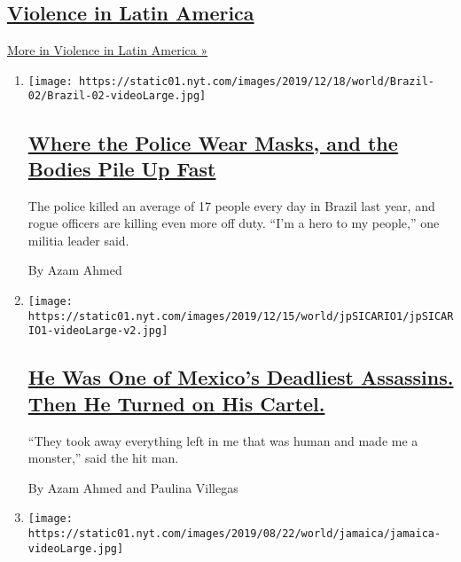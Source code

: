 \hypertarget{violence-in-latin-america}{%
\subsection{\texorpdfstring{\href{/spotlight/violence-in-latin-america}{Violence
in Latin
America}}{Violence in Latin America}}\label{violence-in-latin-america}}

\href{/spotlight/violence-in-latin-america}{More in Violence in Latin
America »}

\begin{enumerate}
\def\labelenumi{\arabic{enumi}.}
\item
  \texttt{[image: https://static01.nyt.com/images/2019/12/18/world/Brazil-02/Brazil-02-videoLarge.jpg]}

  \hypertarget{where-the-police-wear-masks-and-the-bodies-pile-up-fast}{%
  \subsection{\texorpdfstring{\href{/2019/12/20/world/americas/brazil-police-shootings-murder.html}{Where
  the Police Wear Masks, and the Bodies Pile Up
  Fast}}{Where the Police Wear Masks, and the Bodies Pile Up Fast}}\label{where-the-police-wear-masks-and-the-bodies-pile-up-fast}}

  The police killed an average of 17 people every day in Brazil last
  year, and rogue officers are killing even more off duty. ``I'm a hero
  to my people,'' one militia leader said.

  By Azam Ahmed
\item
  \texttt{[image: https://static01.nyt.com/images/2019/12/15/world/jpSICARIO1/jpSICARIO1-videoLarge-v2.jpg]}

  \hypertarget{he-was-one-of-mexicos-deadliest-assassins-then-he-turned-on-his-cartel}{%
  \subsection{\texorpdfstring{\href{/2019/12/14/world/americas/sicario-mexico-drug-cartels.html}{He
  Was One of Mexico's Deadliest Assassins. Then He Turned on His
  Cartel.}}{He Was One of Mexico's Deadliest Assassins. Then He Turned on His Cartel.}}\label{he-was-one-of-mexicos-deadliest-assassins-then-he-turned-on-his-cartel}}

  ``They took away everything left in me that was human and made me a
  monster,'' said the hit man.

  By Azam Ahmed and Paulina Villegas
\item
  \texttt{[image: https://static01.nyt.com/images/2019/08/22/world/jamaica/jamaica-videoLarge.jpg]}


\end{enumerate}
